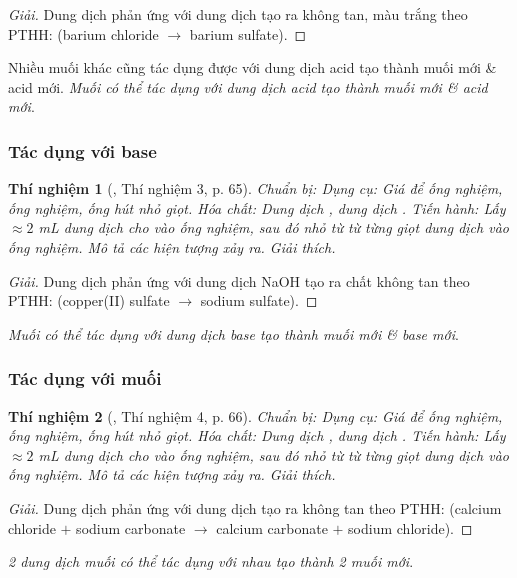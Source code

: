 \documentclass{article}
\newtheorem{thinghiem}{Thí nghiệm}
\begin{document}
\begin{proof}[Giải]
	Dung dịch  phản ứng với dung dịch  tạo ra  không tan, màu trắng theo PTHH:  (barium chloride $\to$ barium sulfate).
\end{proof}
Nhiều muối khác cũng tác dụng được với dung dịch acid tạo thành muối mới \& acid mới. \textit{Muối có thể tác dụng với dung dịch acid tạo thành muối mới \& acid mới}.

\subsubsection{Tác dụng với base}

\begin{thinghiem}[\cite{SGK_KHTN_8_Canh_Dieu}, Thí nghiệm 3, p. 65]
	{\rm Chuẩn bị:} Dụng cụ: Giá để ống nghiệm, ống nghiệm, ống hút nhỏ giọt. Hóa chất: Dung dịch {\rm{}}, dung dịch {\rm{}}. {\rm Tiến hành:} Lấy $\approx2$ {\rm mL} dung dịch {\rm{}} cho vào ống nghiệm, sau đó nhỏ từ từ từng giọt dung dịch {\rm{}} vào ống nghiệm. Mô tả các hiện tượng xảy ra. Giải thích.
\end{thinghiem}

\begin{proof}[Giải]
	Dung dịch  phản ứng với dung dịch NaOH tạo ra chất không tan  theo PTHH:  (copper(II) sulfate $\to$ sodium sulfate).
\end{proof}
\textit{Muối có thể tác dụng với dung dịch base tạo thành muối mới \& base mới}.

\subsubsection{Tác dụng với muối}

\begin{thinghiem}[\cite{SGK_KHTN_8_Canh_Dieu}, Thí nghiệm 4, p. 66]
	{\rm Chuẩn bị:} Dụng cụ: Giá để ống nghiệm, ống nghiệm, ống hút nhỏ giọt. Hóa chất: Dung dịch {\rm{}}, dung dịch {\rm{}}. {\rm Tiến hành:} Lấy $\approx2$ {\rm mL} dung dịch {\rm{}} cho vào ống nghiệm, sau đó nhỏ từ từ từng giọt dung dịch {\rm{}} vào ống nghiệm. Mô tả các hiện tượng xảy ra. Giải thích.
\end{thinghiem}

\begin{proof}[Giải]
	Dung dịch  phản ứng với dung dịch  tạo ra  không tan theo PTHH:  (calcium chloride $+$ sodium carbonate $\to$ calcium carbonate $+$ sodium chloride).
\end{proof}
\textit{2 dung dịch muối có thể tác dụng với nhau tạo thành 2 muối mới}.
\end{document}
